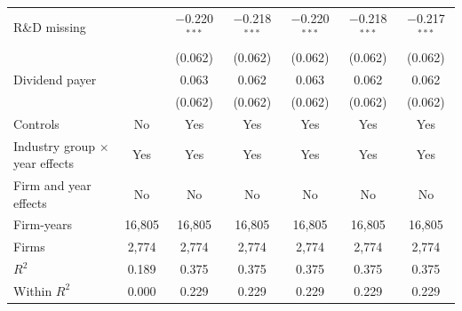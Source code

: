 \begin{tabular}{lcccccc}
R\&D missing &  & $-$0.220$^{***}$ & $-$0.218$^{***}$ & $-$0.220$^{***}$ & $-$0.218$^{***}$ & $-$0.217$^{***}$ \\
 &  & (0.062) & (0.062) & (0.062) & (0.062) & (0.062) \\
Dividend payer &  & 0.063 & 0.062 & 0.063 & 0.062 & 0.062 \\
 &  & (0.062) & (0.062) & (0.062) & (0.062) & (0.062) \\
\midrule
Controls & No & Yes & Yes & Yes & Yes & Yes \\
Industry group $\times$ year effects & Yes & Yes & Yes & Yes & Yes & Yes \\
Firm and year effects & No & No & No & No & No & No \\
Firm-years & 16,805 & 16,805 & 16,805 & 16,805 & 16,805 & 16,805 \\
Firms & 2,774 & 2,774 & 2,774 & 2,774 & 2,774 & 2,774 \\
$R^2$ & 0.189 & 0.375 & 0.375 & 0.375 & 0.375 & 0.375 \\
Within $R^2$ & 0.000 & 0.229 & 0.229 & 0.229 & 0.229 & 0.229 \\
\bottomrule
\end{tabular}

